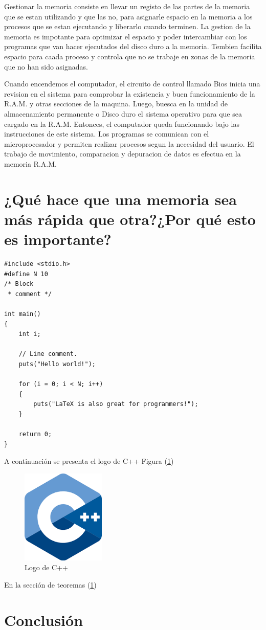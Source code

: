 \documentclass{article}
\begin{document}
Gestionar la memoria consiste en llevar un registo de las partes de la memoria que se estan utilizando y que las no, para asignarle espacio en la memoria a los procesos que se estan ejecutando y liberarlo cuando terminen.
La gestion de la memoria es impotante para optimizar el espacio y poder intercambiar con los programas que van hacer ejecutados del disco duro a la memoria. Tembien facilita espacio para caada proceso y controla que no se trabaje en zonas de la memoria que no han sido asignadas.

\vspace{0.5cm}

Cuando encendemos el computador, el circuito de control llamado Bios inicia una revision en el sistema para comprobar la existencia y buen funcionamiento de la R.A.M. y otras secciones de la maquina. Luego, buesca en la unidad de almacenamiento permanente o Disco duro el sistema operativo para que sea cargado en la R.A.M. Entonces, el computador queda funcionando bajo las instrucciones de este sistema.
Los programas se comunican con el microprocesador y permiten realizar procesos segun la necesidad del usuario. El trabajo de movimiento, comparacion y depuracion de datos es efectua en la memoria R.A.M. \cite{3website}

\section{¿Qué hace que una memoria sea más rápida que otra?¿Por qué esto es importante?} \label{contenido}

\begin{lstlisting}
#include <stdio.h>
#define N 10
/* Block
 * comment */

int main()
{
    int i;

    // Line comment.
    puts("Hello world!");
    
    for (i = 0; i < N; i++)
    {
        puts("LaTeX is also great for programmers!");
    }

    return 0;
}
\end{lstlisting}

A continuación se presenta el logo de C++ Figura (\ref{fig:cpplogo})

\begin{figure}[h]
\includegraphics[width=4cm]{cpplogo.png}
\centering
\caption{Logo de C++}
\label{fig:cpplogo}
\end{figure}

En la sección de teoremas (\ref{contenido})

\section{Conclusión} \label{conclulsion}



\end{document}
